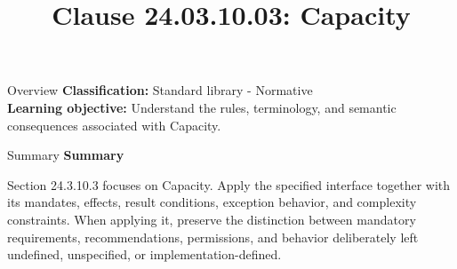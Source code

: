 \documentclass[10pt,letterpaper]{article}
\title{Clause 24.03.10.03: Capacity}
\author{}
\date{}
\begin{document}
\maketitle
\begin{CornellOverviewBox}{Overview}
\textbf{Classification:} Standard library - Normative\\[2pt]
\textbf{Learning objective:} Understand the rules, terminology, and semantic consequences associated with Capacity.
\end{CornellOverviewBox}\begin{CornellSummaryBox}{Summary}
{\sffamily\bfseries\color{Accent} Summary}\par\vspace{3pt}Section 24.3.10.3 focuses on Capacity. Apply the specified interface together with its mandates, effects, result conditions, exception behavior, and complexity constraints. When applying it, preserve the distinction between mandatory requirements, recommendations, permissions, and behavior deliberately left undefined, unspecified, or implementation-defined.
\end{CornellSummaryBox}
\end{document}
